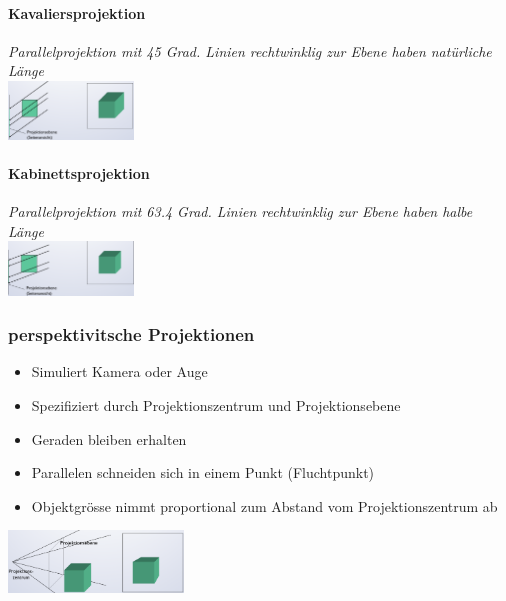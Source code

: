 \paragraph{Kavaliersprojektion}
\textit{Parallelprojektion mit 45 Grad. Linien rechtwinklig zur Ebene haben natürliche Länge}\\
\includegraphics[width=0.25\textwidth]{assets/Kavaliersprojektion.png}

\paragraph{Kabinettsprojektion}
\textit{Parallelprojektion mit 63.4 Grad. Linien rechtwinklig zur Ebene haben halbe Länge}\\
\includegraphics[width=0.25\textwidth]{assets/Kabinettsprojektion.png}

\subsubsection{perspektivitsche Projektionen}
\begin{itemize}
	\item Simuliert Kamera oder Auge
	\item Spezifiziert durch Projektionszentrum und Projektionsebene
	\item Geraden bleiben erhalten
	\item Parallelen schneiden sich in einem Punkt (Fluchtpunkt)
	\item Objektgrösse nimmt proportional zum Abstand vom Projektionszentrum ab
\end{itemize}
\includegraphics[width=0.35\textwidth]{assets/PerspektivischeProjektion.png}